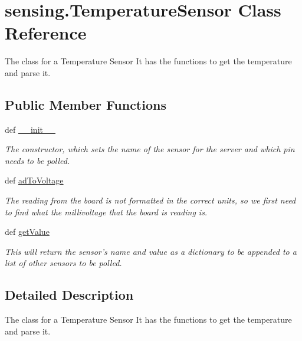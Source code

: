 \hypertarget{classsensing_1_1_temperature_sensor}{\section{sensing.\-Temperature\-Sensor Class Reference}
\label{classsensing_1_1_temperature_sensor}
}


The class for a Temperature Sensor It has the functions to get the temperature and parse it.  


\subsection*{Public Member Functions}
\begin{DoxyCompactItemize}
\item 
def \hyperlink{classsensing_1_1_temperature_sensor_a35bf393ac9f3fadc1bcec9e32eb9a7d6}{\-\_\-\-\_\-init\-\_\-\-\_\-}
\begin{DoxyCompactList}\small\item\em The constructor, which sets the name of the sensor for the server and which pin needs to be polled. \end{DoxyCompactList}\item 
def \hyperlink{classsensing_1_1_temperature_sensor_aaeb85a07038568c56f0e3543815068d7}{ad\-To\-Voltage}
\begin{DoxyCompactList}\small\item\em The reading from the board is not formatted in the correct units, so we first need to find what the millivoltage that the board is reading is. \end{DoxyCompactList}\item 
def \hyperlink{classsensing_1_1_temperature_sensor_a556e30e17858efbb95521dfafe6ee0cc}{get\-Value}
\begin{DoxyCompactList}\small\item\em This will return the sensor's name and value as a dictionary to be appended to a list of other sensors to be polled. \end{DoxyCompactList}\end{DoxyCompactItemize}


\subsection{Detailed Description}
The class for a Temperature Sensor It has the functions to get the temperature and parse it. 

